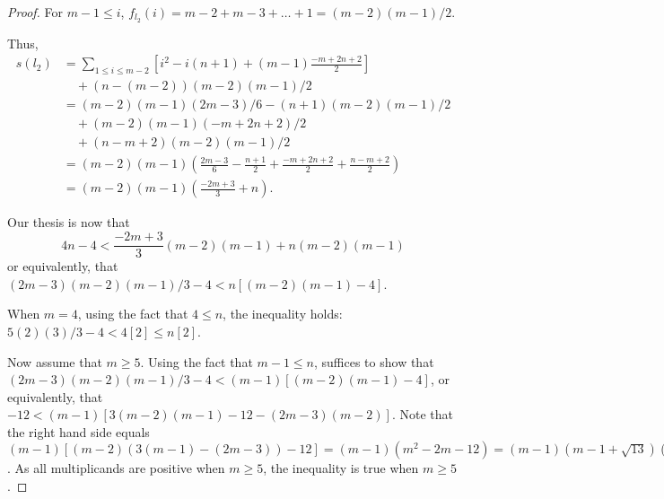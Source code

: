 \documentclass[version=3.21, pagesize, twoside=off, bibliography=totoc, DIV=calc, fontsize=12pt, a4paper]{scrartcl}
\begin{document}
\begin{proof}
	For $m - 1 ≤ i$, $f_{l_2}(i) = m - 2 + m - 3 + … + 1 = (m - 2) (m - 1) / 2$.
	
	Thus, 
	\begin{align}
		s(l_2) &= \sum_{1 ≤ i ≤ m - 2}[i^2 - i (n + 1) + (m - 1) \frac{-m + 2n + 2}{2}] \\
		&\quad + (n - (m - 2)) (m - 2) (m - 1) / 2\\
		&= (m - 2) (m - 1) (2m - 3) / 6 - (n + 1) (m - 2) (m - 1) / 2 \\
		&\quad + (m - 2) (m - 1) (- m + 2n + 2) / 2 \\
		&\quad + (n - m + 2) (m - 2) (m - 1) / 2\\
		&= (m - 2) (m - 1) \left(\frac{2m - 3}{6} - \frac{n + 1}{2} + \frac{- m + 2n + 2}{2} + \frac{n - m + 2}{2}\right)\\
		&= (m - 2) (m - 1) \left(\frac{-2m + 3}{3} + n\right).
	\end{align}
	
	Our thesis is now that 
	\[4n - 4 < \frac{-2m + 3}{3} (m - 2) (m - 1) + n (m - 2) (m - 1)\]
	or equivalently, that 
	$(2m - 3) (m - 2) (m - 1) / 3 - 4 < n [(m - 2) (m - 1) - 4]$.

	When $m = 4$, using the fact that $4 ≤ n$, the inequality holds: $5 (2) (3) / 3 - 4 < 4 [2] ≤ n [2]$.

	Now assume that $m ≥ 5$. Using the fact that $m - 1 ≤ n$, suffices to show that
	$(2m - 3) (m - 2) (m - 1) / 3 - 4 < (m - 1) [(m - 2) (m - 1) - 4]$, or equivalently, that
	$-12 < (m - 1) [3 (m - 2) (m - 1) - 12 - (2m - 3) (m - 2)]$.
	Note that the right hand side equals $(m - 1) [(m - 2) (3 (m - 1) - (2m - 3)) - 12] = (m - 1) (m^2 - 2m - 12) = (m - 1) (m - 1 + \sqrt{13}) (m - 1 - \sqrt{13})$. As all multiplicands are positive when $m ≥ 5$, the inequality is true when $m ≥ 5$.
\end{proof}		
\end{document}
